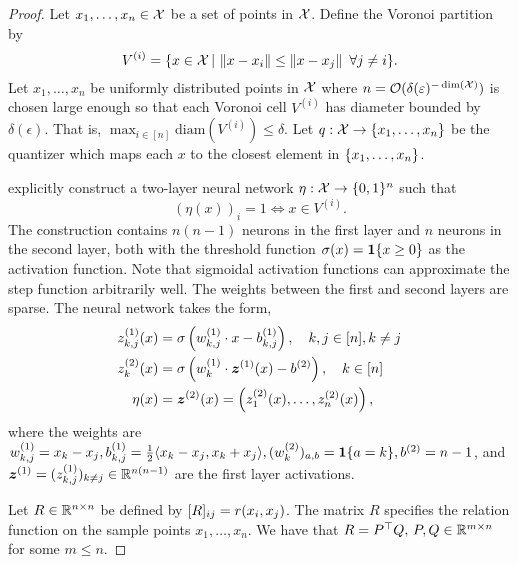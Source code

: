 \begin{proof}
    Let $x_1, \ldots, x_n \in {\mathcal{X}}$ be a set of points in ${\mathcal{X}}$. Define the Voronoi partition by
    \[V^{(i)} = \{x \in {\mathcal{X}} \,|\, \left\lVert x - x_i\right\rVert \leq \left\lVert x - x_j\right\rVert \ \forall j \neq i\}.\]
    Let $x_1, \ldots, x_n$ be uniformly distributed points in ${\mathcal{X}}$ where $n = {\mathcal{O}}(\delta(\varepsilon)^{- \dim({\mathcal{X}})})$ is chosen large enough so that each Voronoi cell $V^{(i)}$ has diameter bounded by $\delta(\epsilon)$.
    That is, $\max_{i \in [n]} \mathrm{diam}(V^{(i)}) \leq \delta$.
    Let $q: {\mathcal{X}} \to \{x_1, \ldots, x_n\}$ be the quantizer which maps each $x$ to the closest element in $\{x_1, \ldots, x_n\}$.

    \citet{wuExplicitNeuralNetwork2018} explicitly construct a two-layer neural network $\eta:{\mathcal{X}} \to \{0, 1\}^{n}$ such that
    \[{(\eta(x))}_i = 1 \iff x \in V^{(i)}.\]
    The construction contains $n (n - 1)$ neurons in the first layer and $n$ neurons in the second layer, both with the threshold function $\sigma(x) = \bm{1}\{x \geq 0\}$ as the activation function. Note that sigmoidal activation functions can approximate the step function arbitrarily well. The weights between the first and second layers are sparse. The neural network takes the form,
    \begin{equation*}
        \begin{aligned}
            z_{k,j}^{(1)}(x) &= \sigma\left(w_{k,j}^{(1)} \cdot x - b_{k,j}^{(1)}\right), \quad k,j \in [n], k \neq j\\
            z_k^{(2)}(x) &= \sigma\left(w_k^{(1)} \cdot \bm{z}^{(1)}(x) - b^{(2)}\right), \quad k \in [n] \\
            \eta(x) &= \bm{z}^{(2)}(x) = \left(z_1^{(2)}(x), \ldots, z_n^{(2)}(x)\right),
        \end{aligned}
    \end{equation*}
    where the weights are $w_{k,j}^{(1)} = x_k - x_j, b_{k,j}^{(1)} = \frac{1}{2} \langle x_k - x_j, x_k + x_j \rangle, (w_{k}^{(2)})_{a,b} = \bm{1}\{a = k\}, b^{(2)} = n - 1$, and $\bm{z}^{(1)} = (z_{k,j}^{(1)})_{k \neq j} \in \mathbb{R}^{n (n - 1)}$ are the first layer activations.

    Let $R \in \mathbb{R}^{n \times n}$ be defined by $[R]_{ij} = r(x_i, x_j)$. The matrix $R$ specifies the relation function on the sample points $x_1, \ldots, x_n$. We have that $R = P^\top Q,\, P,Q \in \mathbb{R}^{m \times n}$ for some $m \leq n$. 


\end{proof}
